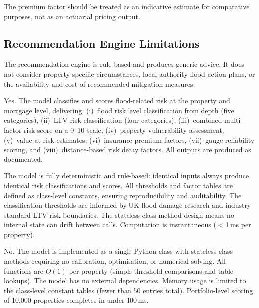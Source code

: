 \documentclass[11pt,a4paper]{article}
\begin{document}
\noindent The premium factor should be treated as an indicative estimate for comparative purposes, not as an actuarial pricing output.

\subsection{Recommendation Engine Limitations}

The recommendation engine is rule-based and produces generic advice. It does not consider property-specific circumstances, local authority flood action plans, or the availability and cost of recommended mitigation measures.

\clearpage

\mkmgovernance

Yes. The model classifies and scores flood-related risk at the property and mortgage level, delivering: (i)~flood risk level classification from depth (five categories), (ii)~LTV risk classification (four categories), (iii)~combined multi-factor risk score on a 0--10 scale, (iv)~property vulnerability assessment, (v)~value-at-risk estimates, (vi)~insurance premium factors, (vii)~gauge reliability scoring, and (viii)~distance-based risk decay factors. All outputs are produced as documented.

The model is fully deterministic and rule-based: identical inputs always produce identical risk classifications and scores. All thresholds and factor tables are defined as class-level constants, ensuring reproducibility and auditability. The classification thresholds are informed by UK flood damage research and industry-standard LTV risk boundaries. The stateless class method design means no internal state can drift between calls. Computation is instantaneous ($<$1\,ms per property).

No. The model is implemented as a single Python class with stateless class methods requiring no calibration, optimisation, or numerical solving. All functions are $O(1)$ per property (simple threshold comparisons and table lookups). The model has no external dependencies. Memory usage is limited to the class-level constant tables (fewer than 50 entries total). Portfolio-level scoring of 10,000 properties completes in under 100\,ms.
\end{document}

